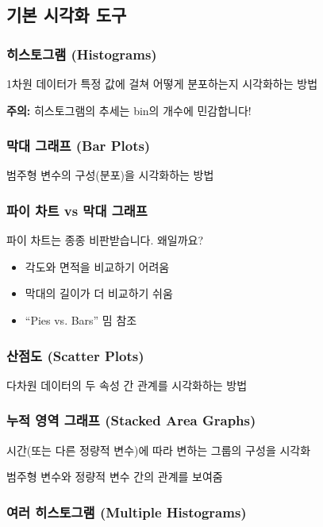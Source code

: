 \documentclass[12pt,a4paper]{article}
\begin{document}
\subsection{기본 시각화 도구}

\subsubsection{히스토그램 (Histograms)}

1차원 데이터가 특정 값에 걸쳐 어떻게 분포하는지 시각화하는 방법

\textbf{주의:} 히스토그램의 추세는 bin의 개수에 민감합니다!

\subsubsection{막대 그래프 (Bar Plots)}

범주형 변수의 구성(분포)을 시각화하는 방법

\subsubsection{파이 차트 vs 막대 그래프}

파이 차트는 종종 비판받습니다. 왜일까요?

\begin{itemize}
    \item 각도와 면적을 비교하기 어려움
    \item 막대의 길이가 더 비교하기 쉬움
    \item ``Pies vs. Bars'' 밈 참조
\end{itemize}

\subsubsection{산점도 (Scatter Plots)}

다차원 데이터의 두 속성 간 관계를 시각화하는 방법

\subsubsection{누적 영역 그래프 (Stacked Area Graphs)}

시간(또는 다른 정량적 변수)에 따라 변하는 그룹의 구성을 시각화

범주형 변수와 정량적 변수 간의 관계를 보여줌

\subsubsection{여러 히스토그램 (Multiple Histograms)}
\end{document}
